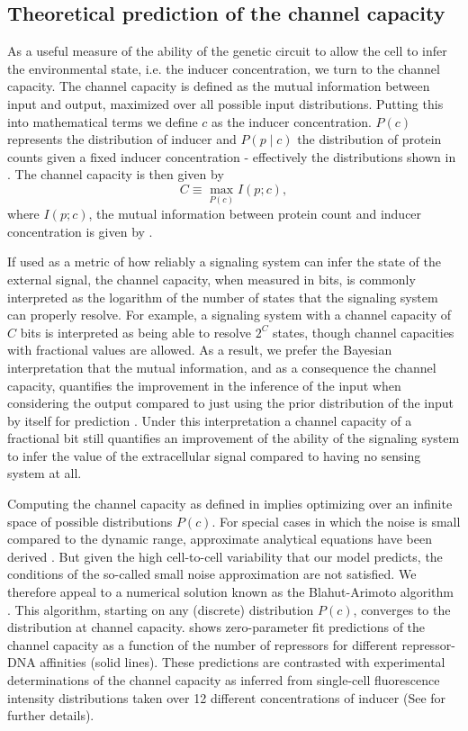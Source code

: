 \subsection{Theoretical prediction of the channel capacity}
\label{sec_channcap}

As a useful measure of the ability of the genetic circuit to allow the cell to
infer the environmental state, i.e. the inducer concentration, we turn to the
channel capacity. The channel capacity is defined as the mutual information
between input and output, maximized over all possible input distributions.
Putting this into mathematical terms we define $c$ as the inducer concentration.
$P(c)$ represents the distribution of inducer and $P(p \mid c)$ the distribution
of protein counts given a fixed inducer concentration - effectively the
distributions shown in . The channel capacity is then given by
\begin{equation}
  C \equiv \max_{P(c)} I(p; c),
  \label{eq_chann_cap}
\end{equation}
where $I(p; c)$, the mutual information between protein count and inducer
concentration is given by .

If used as a metric of how reliably a signaling system can infer the state of
the external signal, the channel capacity, when measured in bits, is commonly
interpreted as the logarithm of the number of states that the signaling system
can properly resolve. For example, a signaling system with a channel capacity of
$C$ bits is interpreted as being able to resolve $2^C$ states, though channel
capacities with fractional values are allowed. As a result, we prefer the
Bayesian interpretation that the mutual information, and as a consequence the
channel capacity, quantifies the improvement in the inference of the input when
considering the output compared to just using the prior distribution of the
input by itself for prediction \cite{Voliotis2014a, Bowsher2014}. Under this
interpretation a channel capacity of a fractional bit still quantifies an
improvement of the ability of the signaling system to infer the value of the
extracellular signal compared to having no sensing system at all.

Computing the channel capacity as defined in  implies
optimizing over an infinite space of possible distributions $P(c)$. For special
cases in which the noise is small compared to the dynamic range, approximate
analytical equations have been derived \cite{Tkacik2008a}. But given the high
cell-to-cell variability that our model predicts, the conditions of the
so-called small noise approximation are not satisfied. We therefore appeal to
a numerical solution known as the Blahut-Arimoto algorithm \cite{Blahut1972}.
This algorithm, starting on any (discrete) distribution $P(c)$, converges to the
distribution at channel capacity.  shows zero-parameter fit
predictions of the channel capacity as a function of the number of repressors
for different repressor-DNA affinities (solid lines). These predictions are
contrasted with experimental determinations of the channel capacity as inferred
from single-cell fluorescence intensity distributions taken over 12 different
concentrations of inducer (See  for further details).

